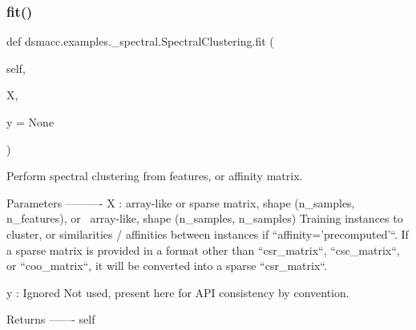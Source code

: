 \subsubsection{\texorpdfstring{fit()}{fit()}}
{\footnotesize\ttfamily def dsmacc.\+examples.\+\_\+spectral.\+Spectral\+Clustering.\+fit (\begin{DoxyParamCaption}\item[{}]{self,  }\item[{}]{X,  }\item[{}]{y = {\ttfamily None} }\end{DoxyParamCaption})}

\begin{DoxyVerb}Perform spectral clustering from features, or affinity matrix.

Parameters
----------
X : array-like or sparse matrix, shape (n_samples, n_features), or \
    array-like, shape (n_samples, n_samples)
    Training instances to cluster, or similarities / affinities between
    instances if ``affinity='precomputed'``. If a sparse matrix is
    provided in a format other than ``csr_matrix``, ``csc_matrix``,
    or ``coo_matrix``, it will be converted into a sparse
    ``csr_matrix``.

y : Ignored
    Not used, present here for API consistency by convention.

Returns
-------
self\end{DoxyVerb}
 
